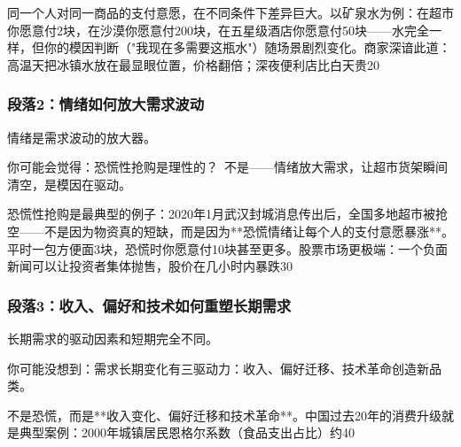 \documentclass[openany, a4paper, 12pt]{book}
\begin{document}
同一个人对同一商品的支付意愿，在不同条件下差异巨大。以矿泉水为例：在超市你愿意付2块，在沙漠你愿意付200块，在五星级酒店你愿意付50块——水完全一样，但你的模因判断（"我现在多需要这瓶水"）随场景剧烈变化。商家深谙此道：高温天把冰镇水放在最显眼位置，价格翻倍；深夜便利店比白天贵20%

	\subsubsection*{段落2：情绪如何放大需求波动}
	情绪是需求波动的放大器。
	\begin{tcolorbox}[colback=yellow!5, title=\textit{读者行为预测}]
		你可能会觉得：恐慌性抢购是理性的？\ 不是——情绪放大需求，让超市货架瞬间清空，是模因在驱动。
	\end{tcolorbox}

恐慌性抢购是最典型的例子：2020年1月武汉封城消息传出后，全国多地超市被抢空——不是因为物资真的短缺，而是因为**恐慌情绪让每个人的支付意愿暴涨**。平时一包方便面3块，恐慌时你愿意付10块甚至更多。股票市场更极端：一个负面新闻可以让投资者集体抛售，股价在几小时内暴跌30%

	\subsubsection*{段落3：收入、偏好和技术如何重塑长期需求}
	长期需求的驱动因素和短期完全不同。
	\begin{tcolorbox}[colback=yellow!5, title=\textit{读者行为预测}]
		你可能没想到：需求长期变化有三驱动力：收入、偏好迁移、技术革命创造新品类。
	\end{tcolorbox}

不是恐慌，而是**收入变化、偏好迁移和技术革命**。中国过去20年的消费升级就是典型案例：2000年城镇居民恩格尔系数（食品支出占比）约40%
\end{document}
